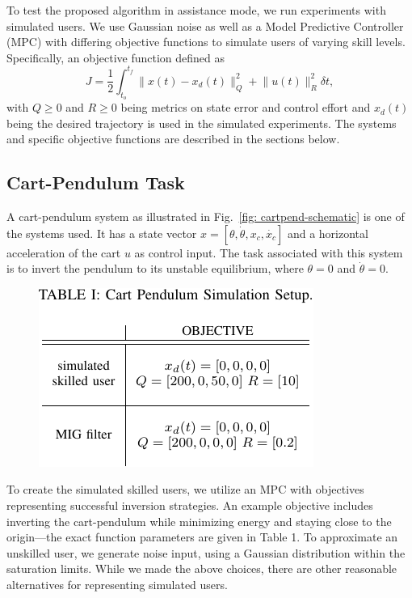 To test the proposed algorithm in assistance mode, we run experiments with simulated users. We use Gaussian noise as well as a Model Predictive Controller (MPC) with differing objective functions to simulate users of varying skill levels. Specifically, an objective function defined as 
\begin{equation}
J = \frac{1}{2} \int_{t_o}^{t_f} \lVert x(t) - x_d(t)\rVert_{Q}^2 + \lVert u(t) \rVert_{R}^2 \delta t,
\end{equation}
with $Q \ge 0$ and $R \ge 0$ being metrics on state error and control effort and $x_d(t)$ being the desired trajectory is used in the simulated experiments. The systems and specific objective functions are described in the sections below. 


\subsection{Cart-Pendulum Task}

A cart-pendulum system as illustrated in Fig.~\ref{fig: cartpend-schematic} is one of the systems used. It has a state vector $x=[\theta, \dot{\theta}, x_c, \dot{x_c}]$ and a horizontal acceleration of the cart $u$ as control input. The task associated with this system is to invert the pendulum to its unstable equilibrium, where $\theta = 0$ and $\dot{\theta} = 0$. 

\begin{figure}[h]
	\begin{center}
		\includegraphics[width=0.6\columnwidth, keepaspectratio]{cp_table.pdf}\par
	\end{center}
\caption*{}
\vspace{-1.3cm}
\label{table_cp}
\end{figure}

To create the simulated skilled users, we utilize an MPC with objectives representing successful inversion strategies. An example objective includes inverting the cart-pendulum while minimizing energy and staying close to the origin---the exact function parameters are given in Table 1. To approximate an unskilled user, we generate noise input, using a Gaussian distribution within the saturation limits. While we made the above choices, there are other reasonable alternatives for representing simulated users.

